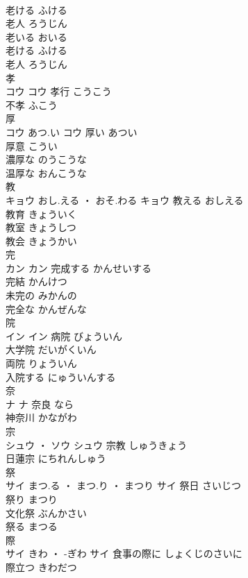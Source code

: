 \documentclass[8pt]{extreport}
\begin{document}
\begin{CJK}{UTF8}{min}
\\	老ける	ふける	
\\	老人	ろうじん	
\\	老いる	おいる	
\\	老ける	ふける	
\\	老人	ろうじん	
\\	孝	
\\	コウ		コウ													孝行	こうこう	
\\	不孝	ふこう	
\\	厚	
\\	コウ	あつ.い	コウ	厚い	あつい	
\\	厚意	こうい	
\\	濃厚な	のうこうな	
\\	温厚な	おんこうな	
\\	教	
\\	キョウ	おし.える ・ おそ.わる	キョウ	教える	おしえる	
\\	教育	きょういく	
\\	教室	きょうしつ	
\\	教会	きょうかい	
\\	完	
\\	カン		カン	完成する	かんせいする	
\\	完結	かんけつ	
\\	未完の	みかんの	
\\	完全な	かんぜんな	
\\	院	
\\	イン		イン	病院	びょういん	
\\	大学院	だいがくいん	
\\	両院	りょういん	
\\	入院する	にゅういんする	
\\	奈	
\\	ナ		ナ													奈良	なら	
\\	神奈川	かながわ	
\\	宗	
\\	シュウ ・ ソウ		シュウ	宗教	しゅうきょう	
\\	日蓮宗	にちれんしゅう	
\\	祭	
\\	サイ	まつ.る ・ まつ.り ・ まつり	サイ	祭日	さいじつ	
\\	祭り	まつり	
\\	文化祭	ぶんかさい	
\\	祭る	まつる	
\\	際	
\\	サイ	きわ ・ -ぎわ	サイ	食事の際に	しょくじのさいに	
\\	際立つ	きわだつ	

\end{CJK}
\end{document}
